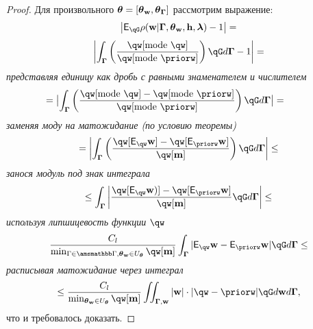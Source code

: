 \begin{proof}
Для произвольного $\boldsymbol{\theta}=[\boldsymbol{\theta}_\mathbf{w}, \boldsymbol{\theta}_{\boldsymbol{\Gamma}}]$ рассмотрим выражение:
\[
   \left|\E_{\qG} {\rho}(\w|\G, \tetaw, \h, \lam) - 1\right| =
\]
\[
   \left|\int_{\G} \left(\frac{\qw[\text{mode}~\qw]}{\qw[\text{mode}~\priorw]} \right)\qG d\G  - 1 \right| =
\]
\textit{представляя единицу как дробь с равными знаменателем и числителем}
\begin{multline*}
\hspace{-1cm}
 =  \bigl|\int_{\G} \left(\frac{\qw[\text{mode}~\qw] - \qw[\text{mode}~\priorw]}{\qw[\text{mode}~\priorw]}\right) \qG d\G \bigr| =
\end{multline*}
\textit{заменяя моду на матожидание (по условию теоремы)}
\[  = \left|\int_{\G} \left( \frac{\qw[\E_{\qw}\w] - \qw[\E_{\priorw} \w]}{\qw[\mathbf{m}]}\right)  \qG d\G\right| \leq 
\]
\textit{занося модуль под знак интеграла}
\[
\leq 
\int_{\G} \left|\frac{\qw[\E_{\qw} \w)] - \qw[\E_{\priorw} \w]}{{\qw[\mathbf{m}]}} \qG d\G\right| \leq
\]
\textit{используя липшицевость функции }$\qw$
\[
\frac{C_l}{\min_{\Gamma \in \Gb, \tetaw \in \Uteta} \qw[\mathbf{m}]}\int_{\G}  |\E_{\qw}\w - \E_{\priorw}\w|\qG d\G  \leq
\]
\textit{расписывая матожидание через интеграл}
\[
    \leq \frac{C_l}{\min_{\tetaw \in \Uteta} \qw[\mathbf{m}]} \iint_{\G,\w} |\w| \cdot |\qw - \priorw|\qG d\w d\G,
\] 
что и требовалось доказать.
\end{proof}



